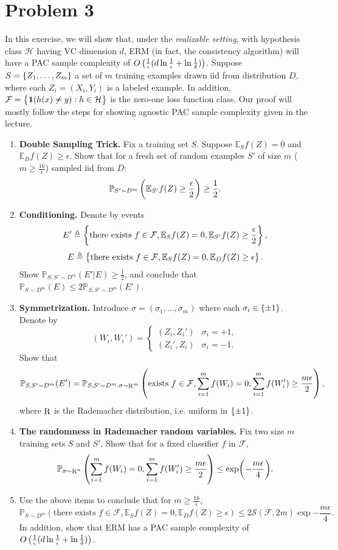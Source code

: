 \documentclass{article}
\DeclareMathOperator*{\R}{{\rm R}}
\newcommand{\EE}{\mathbb{E}} %
\newcommand{\PP}{\mathbb{P}} %
\newcommand{\Hcal}{\mathcal{H}} %
\newcommand{\Fcal}{\mathcal{F}} %
\newcommand{\Scal}{\mathcal{S}} %
\newcommand{\defeq}{\triangleq}
\newcommand*{\one}{{\bf 1}}
\begin{document}
\section*{Problem 3}
In this exercise, we will show that, under the {\em realizable setting}, with hypothesis class $\Hcal$ having VC dimension $d$, ERM (in fact, the consistency algorithm) will have a PAC sample complexity of $O\del{\frac1\epsilon(d \ln\frac1\epsilon + \ln\frac1\delta)}$. Suppose $S = \cbr{Z_1,\ldots,Z_m}$ a set of $m$ training examples drawn iid from distribution $D$,
where each $Z_i = (X_i, Y_i)$ is a labeled example. In addition, $\Fcal = \cbr{\one(h(x) \neq y): h \in \Hcal}$ is the zero-one loss function class. Our proof will mostly follow the steps for showing agnostic PAC sample complexity given in the lecture.

\begin{enumerate}
\item \textbf{Double Sampling Trick.} Fix a training set $S$. Suppose $\EE_S f(Z) = 0$ and $\EE_D f(Z) \geq \epsilon$. Show that for a fresh set of random examples $S'$ of size $m$ ($m \geq \frac{16}{\epsilon}$) sampled iid from $D$:
\[ \PP_{S' \sim D^m}\del{ \EE_{S'} f(Z) \geq \frac \epsilon 2} \geq \frac 1 2. \]

\item \textbf{Conditioning.} Denote by events
\[ E' \defeq \cbr{\text{there exists } f \in \Fcal, \EE_S f(Z) = 0, \EE_{S'} f(Z) \geq \frac \epsilon 2}, \]
\[ E \defeq \cbr{\text{there exists } f \in \Fcal, \EE_S f(Z) = 0, \EE_D f(Z) \geq \epsilon}. \]
Show $\PP_{S, S' \sim D^m}(E'|E) \geq \frac 12$, and conclude that $\PP_{S \sim D^m}(E) \leq 2\PP_{S, S' \sim D^m}(E')$.

\item \textbf{Symmetrization.} Introduce $\sigma = (\sigma_1,\ldots,\sigma_m)$ where each $\sigma_i \in \cbr{\pm 1}$. Denote by
\[
  (W_i, W_i') = \begin{cases} (Z_i, Z_i') & \sigma_i = +1, \\ (Z_i', Z_i) & \sigma_i = -1. \end{cases}
\]
Show that
\[ \PP_{S, S' \sim D^m}(E') = \PP_{S, S' \sim D^m, \sigma \sim \R^m}\del{\text{exists } f \in \Fcal, \sum_{i=1}^m f(W_i) = 0, \sum_{i=1}^m f(W_i') \geq \frac{m\epsilon}{2}}, \]
where $\R$ is the Rademacher distribution, i.e. uniform in $\cbr{\pm 1}$.

\item \textbf{The randomness in Rademacher random variables.} Fix two size $m$ training sets $S$ and $S'$. Show that for a fixed classifier
$f$ in $\Fcal$,
\[ \PP_{\sigma \sim \R^n} \del{ \sum_{i=1}^m f(W_i) = 0, \sum_{i=1}^m f(W_i') \geq \frac{m\epsilon}{2} } \leq \exp(-\frac{m\epsilon}{4}).  \]

\item Use the above items to conclude that for $m \geq \frac{16}{\epsilon}$,
\[ \PP_{S \sim D^m}(\text{there exists } f \in \Fcal, \EE_S f(Z) = 0, \EE_D f(Z) \geq \epsilon) \leq 2 \Scal(\Fcal, 2m) \exp{-\frac{m\epsilon}{4}}. \]
In addition, show that ERM has a PAC sample complexity of $O\del{\frac1\epsilon(d \ln\frac1\epsilon + \ln\frac1\delta)}$.
\end{enumerate}
\end{document}
